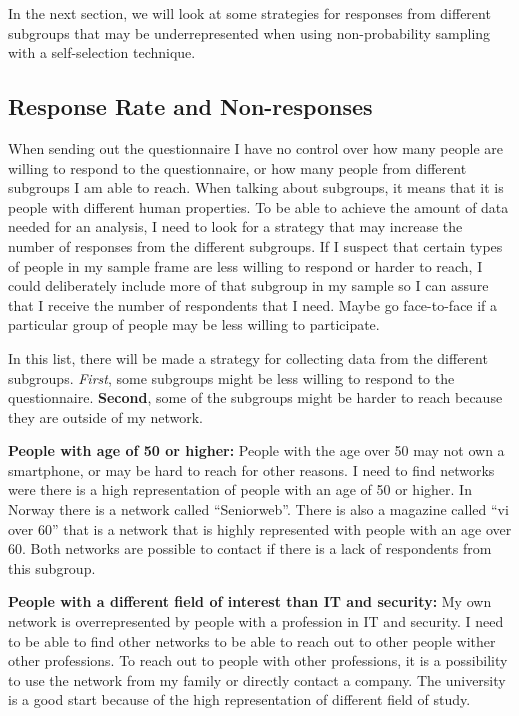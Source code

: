     In the next section, we will look at some strategies for responses from different subgroups that may be underrepresented when using non-probability sampling with a self-selection technique. 

    \subsection{Response Rate and Non-responses} \label{sec:response}

    When sending out the questionnaire I have no control over how many people are willing to respond to the questionnaire, or how many people from different subgroups I am able to reach. When talking about subgroups, it means that it is people with different human properties. To be able to achieve the amount of data needed for an analysis, I need to look for a strategy that may increase the number of responses from the different subgroups. If I suspect that certain types of people in my sample frame are less willing to respond or harder to reach, I could deliberately include more of that subgroup in my sample so I can assure that I receive the number of respondents that I need. Maybe go face-to-face if a particular group of people may be less willing to participate. 

    In this list, there will be made a strategy for collecting data from the different subgroups. {\it First}, some subgroups might be less willing to respond to the questionnaire. {\bf Second}, some of the subgroups might be harder to reach because they are outside of my network. 

    {\bf People with age of 50 or higher:} People with the age over 50 may not own a smartphone, or may be hard to reach for other reasons. I need to find networks were there is a high representation of people with an age of 50 or higher. In Norway there is a network called ``Seniorweb''. There is also a magazine called ``vi over 60'' that is a network that is highly represented with people with an age over 60. Both networks are possible to contact if there is a lack of respondents from this subgroup. 

    {\bf People with a different field of interest than IT and security:} My own network is overrepresented by people with a profession in IT and security. I need to be able to find other networks to be able to reach out to other people wither other professions. To reach out to people with other professions, it is a possibility to use the network from my family or directly contact a company. The university is a good start because of the high representation of different field of study. 
    
